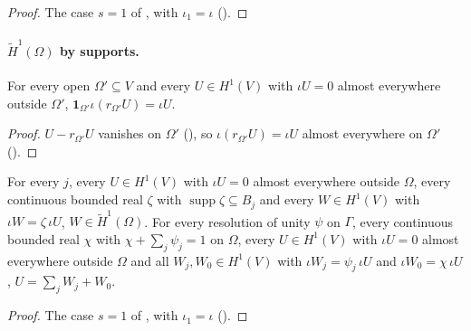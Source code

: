 \begin{proof}
\leanok
The case $s = 1$ of , with $\iota_1 = \iota$
().
\end{proof}

\paragraph{$\tilde H^1(\Omega)$ by supports.}

\begin{lemma}
\label{lem:zero-extension-restriction}
\leanok
{}
For every open $\Omega' \subseteq V$ and every $U \in H^1(V)$ with $\iota U = 0$ almost everywhere
outside $\Omega'$, $\mathbf 1_{\Omega'} \iota (r_{\Omega'} U) = \iota U$.
\end{lemma}

\begin{proof}
\leanok
$U - r_{\Omega'} U$ vanishes on $\Omega'$ (), so
$\iota (r_{\Omega'} U) = \iota U$ almost everywhere on $\Omega'$
().
\end{proof}

\begin{lemma}
\label{lem:tilde-space-chart-pieces}
\leanok
{}
For every $j$, every $U \in H^1(V)$ with $\iota U = 0$ almost everywhere outside $\Omega$, every
continuous bounded real $\zeta$ with $\operatorname{supp} \zeta \subseteq B_j$ and every
$W \in H^1(V)$ with $\iota W = \zeta \, \iota U$, $W \in \tilde H^1(\Omega)$. For every resolution
of unity $\psi$ on $\Gamma$, every continuous bounded real $\chi$ with $\chi + \sum_j \psi_j = 1$
on $\Omega$, every $U \in H^1(V)$ with $\iota U = 0$ almost everywhere outside $\Omega$ and all
$W_j, W_0 \in H^1(V)$ with $\iota W_j = \psi_j \, \iota U$ and $\iota W_0 = \chi \, \iota U$,
$U = \sum_j W_j + W_0$.
\end{lemma}

\begin{proof}
\leanok
The case $s = 1$ of , with $\iota_1 = \iota$
().
\end{proof}

